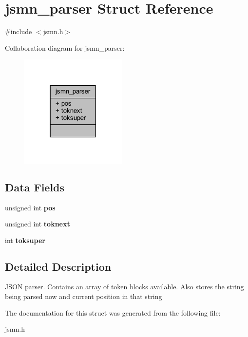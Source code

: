 \hypertarget{structjsmn__parser}{}\section{jsmn\+\_\+parser Struct Reference}
\label{structjsmn__parser}


{\ttfamily \#include $<$jsmn.\+h$>$}



Collaboration diagram for jsmn\+\_\+parser\+:
\nopagebreak
\begin{figure}[H]
\begin{center}
\leavevmode
\includegraphics[width=150pt]{structjsmn__parser__coll__graph}
\end{center}
\end{figure}
\subsection*{Data Fields}
\begin{DoxyCompactItemize}
\item 
\mbox{\label{structjsmn__parser_addcb93d939ffa259ff1d9247bdd590fd}} 
unsigned int {\bfseries pos}
\item 
\mbox{\label{structjsmn__parser_a07a43834d3e063cab9e9a69b37dc55b8}} 
unsigned int {\bfseries toknext}
\item 
\mbox{\label{structjsmn__parser_a81bf640a522fb6791889aac12f71f8db}} 
int {\bfseries toksuper}
\end{DoxyCompactItemize}


\subsection{Detailed Description}
J\+S\+ON parser. Contains an array of token blocks available. Also stores the string being parsed now and current position in that string 

The documentation for this struct was generated from the following file\+:\begin{DoxyCompactItemize}
\item 
jsmn.\+h\end{DoxyCompactItemize}
